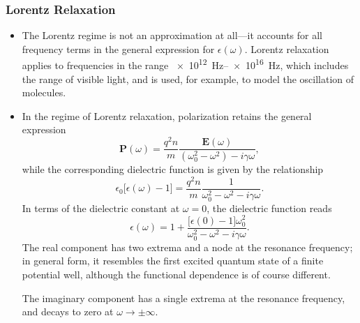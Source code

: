 \documentclass[11pt, a4paper]{article}
\renewcommand{\vec}[1]{\bm{#1}} %
\newcommand{\E}{\vec{E}} %
\renewcommand{\P}{\vec{P}}  %
\newcommand{\ee}{\epsilon_{0}}  %
\begin{document}
\subsubsection{Lorentz Relaxation}
\begin{itemize}
    \item The Lorentz regime is not an approximation at all---it accounts for all frequency terms in the general expression for $ \epsilon(\omega) $. Lorentz relaxation applies to frequencies in the range \SIrange{e12}{e16}{\hertz}, which includes the range of visible light, and is used, for example, to model the oscillation of molecules. 

    \item In the regime of Lorentz relaxation, polarization retains the general expression
    \begin{equation*}
        \P(\omega) = \frac{q^{2}n}{m} \frac{\E(\omega)}{(\omega_{0}^{2} - \omega^{2}) - i \gamma \omega},
    \end{equation*}
    while the corresponding dielectric function is given by the relationship
    \begin{equation*}
        \ee \big[ \epsilon(\omega) - 1 \big] = \frac{q^{2}n}{m}\frac{1}{\omega_{0}^{2} - \omega^{2} - i \gamma\omega}.
    \end{equation*}
    In terms of the dielectric constant at $ \omega = 0 $, the dielectric function reads
    \begin{equation*}
         \epsilon(\omega) = 1 + \frac{ \big[ \epsilon(0) - 1 \big]\omega_{0}^{2}}{\omega_{0}^{2} - \omega^{2} - i \gamma\omega}.
    \end{equation*}
    The real component has two extrema and a node at the resonance frequency; in general form, it resembles the first excited quantum state of a finite potential well, although the functional dependence is of course different.

    The imaginary component has a single extrema at the resonance frequency, and decays to zero at $ \omega \to \pm \infty $. 

\end{itemize}
\end{document}

